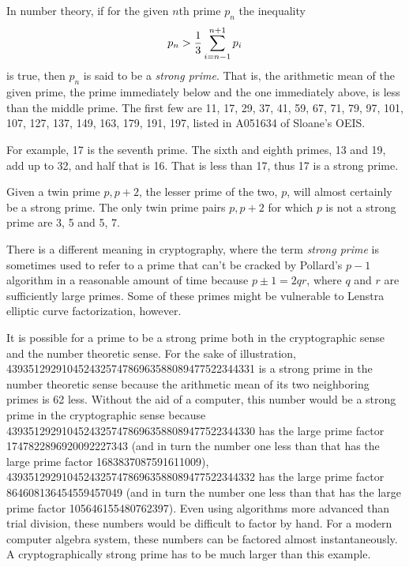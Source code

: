 \documentclass[12pt]{article}
\begin{document}
In number theory, if for the given $n$th prime $p_n$ the inequality $$p_n > {1 \over 3} \sum_{i = n - 1}^{n + 1} p_i$$ is true, then $p_n$ is said to be a {\em strong prime}. That is, the arithmetic mean of the given prime, the prime immediately below and the one immediately above, is less than the middle prime. The first few are 11, 17, 29, 37, 41, 59, 67, 71, 79, 97, 101, 107, 127, 137, 149, 163, 179, 191, 197, listed in  A051634 of Sloane's OEIS.

For example, 17 is the seventh prime. The sixth and eighth primes, 13 and 19, add up to 32, and half that is 16. That is less than 17, thus 17 is a strong prime.

Given a twin prime ${p, p + 2}$, the lesser prime of the two, $p$, will almost certainly be a strong prime.  The only twin prime pairs ${p, p + 2}$ for which $p$ is not a strong prime are {3, 5} and {5, 7}.

There is a different meaning in cryptography, where the term {\em strong prime} is sometimes used to refer to a prime that can't be cracked by Pollard's $p - 1$ algorithm in a reasonable amount of time because $p \pm 1 = 2qr$, where $q$ and $r$ are sufficiently large primes. Some of these primes might be vulnerable to Lenstra elliptic curve factorization, however.

It is possible for a prime to be a strong prime both in the cryptographic sense and the number theoretic sense. For the sake of illustration, 439351292910452432574786963588089477522344331 is a strong prime in the number theoretic sense because the arithmetic mean of its two neighboring primes is 62 less. Without the aid of a computer, this number would be a strong prime in the cryptographic sense because 439351292910452432574786963588089477522344330 has the large prime factor 1747822896920092227343 (and in turn the number one less than that has the large prime factor 1683837087591611009), 439351292910452432574786963588089477522344332 has the large prime factor 864608136454559457049 (and in turn the number one less than that has the large prime factor 105646155480762397). Even using algorithms more advanced than trial division, these numbers would be difficult to factor by hand. For a modern computer algebra system, these numbers can be factored almost instantaneously. A cryptographically strong prime has to be much larger than this example.
\end{document}
